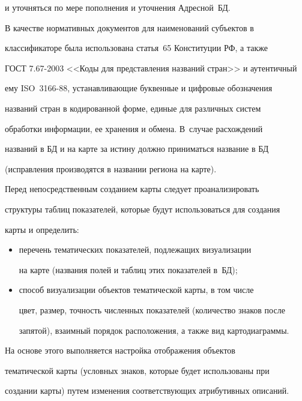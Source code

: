 и уточняться по мере пополнения и уточнения Адресной~БД. 


     


     В качестве нормативных документов для наименований субъектов в 


классификаторе была использована статья~65 Конституции РФ, а также 


ГОСТ 7.67-2003 <<Коды для представления названий стран>> и аутентичный 


ему ISO~3166-88, устанавливающие  буквенные и цифровые обозначения 


названий стран в кодированной форме, единые для различных систем 


обработки информации, ее хранения и обмена. В~случае расхождений 


названий в БД и на карте за истину должно приниматься название в БД 


(исправления производятся в названии региона на карте).


     


     Перед непосредственным созданием карты следует проанализировать 


структуры таблиц показателей, которые будут использоваться для создания 


карты и определить:


     \begin{itemize}


     \item перечень тематических показателей, подлежащих визуализации 


на карте (названия полей и таблиц этих показателей в~БД);


     \item способ визуализации объектов тематической карты, в том числе 


цвет, раз\-мер, точ\-ность численных показателей (количество знаков после 


запятой), взаимный порядок расположения, а также вид картодиаграммы.


     \end{itemize}


     


     На основе этого выполняется настройка отображения объектов 


тематической карты (условных знаков, которые будет использованы при 


создании карты) путем изменения соответствующих атрибутивных описаний. 


